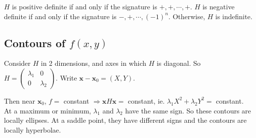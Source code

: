 \documentclass[a4paper]{article}
\begin{document}
\begin{prop}
  $H$ is positive definite if and only if the signature is $+, +, \cdots, +$. $H$ is negative definite if and only if the signature is $-, +, \cdots, (-1)^n$. Otherwise, $H$ is indefinite.
\end{prop}

\subsection{Contours of \texorpdfstring{$f(x, y)$}{f(x, y)}}
Consider $H$ in 2 dimensions, and axes in which $H$ is diagonal. So $H =
\begin{pmatrix}
  \lambda_1 & 0\\
  0 & \lambda_2
\end{pmatrix}$. Write $\mathbf{x} - \mathbf{x}_0 = (X, Y)$.

Then near $\mathbf{x}_0$, $f = $ constant $\Rightarrow \mathbf{x}H\mathbf{x} = $ constant, ie. $\lambda_1 X^2 + \lambda_2 Y^2 = $ constant. At a maximum or minimum, $\lambda_1$ and $\lambda_2$ have the same sign. So these contours are locally ellipses. At a saddle point, they have different signs and the contours are locally hyperbolae.
\end{document}
